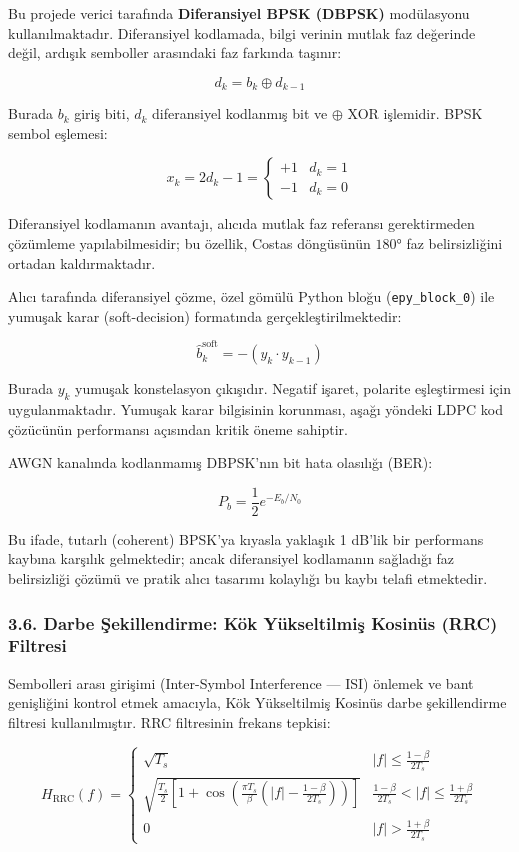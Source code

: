 \documentclass[
]{IEEEtran}
\begin{document}
Bu projede verici tarafında \textbf{Diferansiyel BPSK (DBPSK)}
modülasyonu kullanılmaktadır. Diferansiyel kodlamada, bilgi verinin
mutlak faz değerinde değil, ardışık semboller arasındaki faz farkında
taşınır:

\[d_k = b_k \oplus d_{k-1}\]

Burada \(b_k\) giriş biti, \(d_k\) diferansiyel kodlanmış bit ve
\(\oplus\) XOR işlemidir. BPSK sembol eşlemesi:

\[x_k = 2d_k - 1 = \begin{cases} +1 & d_k = 1 \\ -1 & d_k = 0 \end{cases}\]

Diferansiyel kodlamanın avantajı, alıcıda mutlak faz referansı
gerektirmeden çözümleme yapılabilmesidir; bu özellik, Costas döngüsünün
\(180°\) faz belirsizliğini ortadan kaldırmaktadır.

Alıcı tarafında diferansiyel çözme, özel gömülü Python bloğu
(\texttt{epy\_block\_0}) ile yumuşak karar (soft-decision) formatında
gerçekleştirilmektedir:

\[\hat{b}_k^{\text{soft}} = -(y_k \cdot y_{k-1})\]

Burada \(y_k\) yumuşak konstelasyon çıkışıdır. Negatif işaret, polarite
eşleştirmesi için uygulanmaktadır. Yumuşak karar bilgisinin korunması,
aşağı yöndeki LDPC kod çözücünün performansı açısından kritik öneme
sahiptir.

AWGN kanalında kodlanmamış DBPSK'nın bit hata olasılığı (BER):

\[P_b = \frac{1}{2} e^{-E_b/N_0}\]

Bu ifade, tutarlı (coherent) BPSK'ya kıyasla yaklaşık 1 dB'lik bir
performans kaybına karşılık gelmektedir; ancak diferansiyel kodlamanın
sağladığı faz belirsizliği çözümü ve pratik alıcı tasarımı kolaylığı bu
kaybı telafi etmektedir.

\subsubsection{3.6. Darbe Şekillendirme: Kök Yükseltilmiş Kosinüs (RRC)
Filtresi}\label{darbe-ux15fekillendirme-kuxf6k-yuxfckseltilmiux15f-kosinuxfcs-rrc-filtresi}

Sembolleri arası girişimi (Inter-Symbol Interference --- ISI) önlemek ve
bant genişliğini kontrol etmek amacıyla, Kök Yükseltilmiş Kosinüs darbe
şekillendirme filtresi kullanılmıştır. RRC filtresinin frekans tepkisi:

\[H_{\text{RRC}}(f) = \begin{cases} \sqrt{T_s} & |f| \leq \frac{1-\beta}{2T_s} \\ \sqrt{\frac{T_s}{2}\left[1 + \cos\left(\frac{\pi T_s}{\beta}\left(|f| - \frac{1-\beta}{2T_s}\right)\right)\right]} & \frac{1-\beta}{2T_s} < |f| \leq \frac{1+\beta}{2T_s} \\ 0 & |f| > \frac{1+\beta}{2T_s} \end{cases}\]
\end{document}
